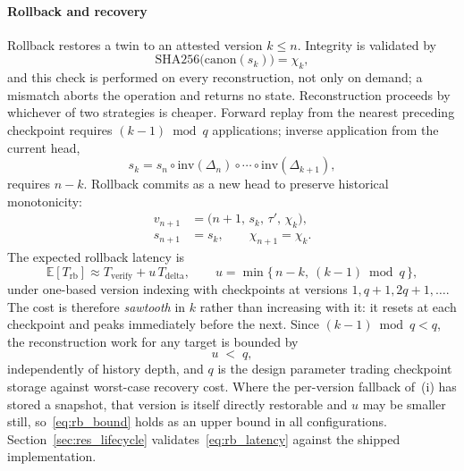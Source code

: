 \documentclass[final,5p,times,twocolumn]{elsarticle}
\begin{document}
\paragraph*{\textbf{Rollback and recovery}}
Rollback restores a twin to an attested version $k\le n$. Integrity is validated by
\begin{equation}
  \mathrm{SHA256}\!\big(\mathrm{canon}(s_k)\big)=\chi_k,
  \label{eq:rb_verify}
\end{equation}
and this check is performed on every reconstruction, not only on demand; a mismatch aborts the operation and returns no state. Reconstruction proceeds by whichever of two strategies is cheaper. Forward replay from the nearest preceding checkpoint requires $(k-1)\bmod q$ applications; inverse application from the current head,
\begin{equation}
  s_k = s_n \circ \mathrm{inv}(\Delta_n)\circ\cdots\circ \mathrm{inv}(\Delta_{k+1}),
  \label{eq:rb_rebuild}
\end{equation}
requires $n-k$. Rollback commits as a new head to preserve historical monotonicity:
\begin{subequations}
\begin{align}
  v_{n+1} &= \big(n{+}1,\,s_k,\,\tau',\,\chi_k\big), \label{eq:rb_newver}\\
  s_{n+1} &= s_k,\qquad \chi_{n+1}=\chi_k. \label{eq:rb_head}
\end{align}
\end{subequations}
The expected rollback latency is
\begin{equation}
  \mathbb{E}[T_{\mathrm{rb}}]
  \approx
  T_{\mathrm{verify}} + u\,T_{\mathrm{delta}},
  \qquad
  u=\min\{\,n-k,\ (k-1)\bmod q\,\},
  \label{eq:rb_latency}
\end{equation}
under one-based version indexing with checkpoints at versions $1, q{+}1, 2q{+}1,\ldots$. The cost is therefore \emph{sawtooth} in $k$ rather than increasing with it: it resets at each checkpoint and peaks immediately before the next. Since $(k-1)\bmod q < q$, the reconstruction work for any target is bounded by
\begin{equation}
  u \;<\; q,
  \label{eq:rb_bound}
\end{equation}
independently of history depth, and $q$ is the design parameter trading checkpoint storage against worst-case recovery cost. Where the per-version fallback of~(i) has stored a snapshot, that version is itself directly restorable and $u$ may be smaller still, so~\eqref{eq:rb_bound} holds as an upper bound in all configurations. Section~\ref{sec:res_lifecycle} validates~\eqref{eq:rb_latency} against the shipped implementation.
\end{document}
